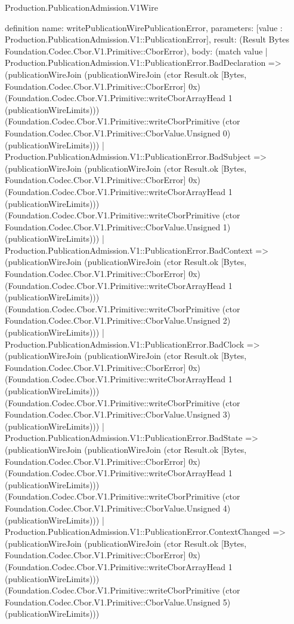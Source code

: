 \begin{lexlean}{Production.PublicationAdmission.V1Wire}
\begin{semanticmodule}
definition{
  name: writePublicationWirePublicationError,
  parameters: [value : Production.PublicationAdmission.V1::PublicationError],
  result: (Result Bytes Foundation.Codec.Cbor.V1.Primitive::CborError),
  body: (match value
    | Production.PublicationAdmission.V1::PublicationError.BadDeclaration => (publicationWireJoin (publicationWireJoin (ctor Result.ok [Bytes, Foundation.Codec.Cbor.V1.Primitive::CborError] 0x) (Foundation.Codec.Cbor.V1.Primitive::writeCborArrayHead 1 (publicationWireLimits))) (Foundation.Codec.Cbor.V1.Primitive::writeCborPrimitive (ctor Foundation.Codec.Cbor.V1.Primitive::CborValue.Unsigned 0) (publicationWireLimits)))
    | Production.PublicationAdmission.V1::PublicationError.BadSubject => (publicationWireJoin (publicationWireJoin (ctor Result.ok [Bytes, Foundation.Codec.Cbor.V1.Primitive::CborError] 0x) (Foundation.Codec.Cbor.V1.Primitive::writeCborArrayHead 1 (publicationWireLimits))) (Foundation.Codec.Cbor.V1.Primitive::writeCborPrimitive (ctor Foundation.Codec.Cbor.V1.Primitive::CborValue.Unsigned 1) (publicationWireLimits)))
    | Production.PublicationAdmission.V1::PublicationError.BadContext => (publicationWireJoin (publicationWireJoin (ctor Result.ok [Bytes, Foundation.Codec.Cbor.V1.Primitive::CborError] 0x) (Foundation.Codec.Cbor.V1.Primitive::writeCborArrayHead 1 (publicationWireLimits))) (Foundation.Codec.Cbor.V1.Primitive::writeCborPrimitive (ctor Foundation.Codec.Cbor.V1.Primitive::CborValue.Unsigned 2) (publicationWireLimits)))
    | Production.PublicationAdmission.V1::PublicationError.BadClock => (publicationWireJoin (publicationWireJoin (ctor Result.ok [Bytes, Foundation.Codec.Cbor.V1.Primitive::CborError] 0x) (Foundation.Codec.Cbor.V1.Primitive::writeCborArrayHead 1 (publicationWireLimits))) (Foundation.Codec.Cbor.V1.Primitive::writeCborPrimitive (ctor Foundation.Codec.Cbor.V1.Primitive::CborValue.Unsigned 3) (publicationWireLimits)))
    | Production.PublicationAdmission.V1::PublicationError.BadState => (publicationWireJoin (publicationWireJoin (ctor Result.ok [Bytes, Foundation.Codec.Cbor.V1.Primitive::CborError] 0x) (Foundation.Codec.Cbor.V1.Primitive::writeCborArrayHead 1 (publicationWireLimits))) (Foundation.Codec.Cbor.V1.Primitive::writeCborPrimitive (ctor Foundation.Codec.Cbor.V1.Primitive::CborValue.Unsigned 4) (publicationWireLimits)))
    | Production.PublicationAdmission.V1::PublicationError.ContextChanged => (publicationWireJoin (publicationWireJoin (ctor Result.ok [Bytes, Foundation.Codec.Cbor.V1.Primitive::CborError] 0x) (Foundation.Codec.Cbor.V1.Primitive::writeCborArrayHead 1 (publicationWireLimits))) (Foundation.Codec.Cbor.V1.Primitive::writeCborPrimitive (ctor Foundation.Codec.Cbor.V1.Primitive::CborValue.Unsigned 5) (publicationWireLimits)))
}
\end{semanticmodule}
\end{lexlean}
